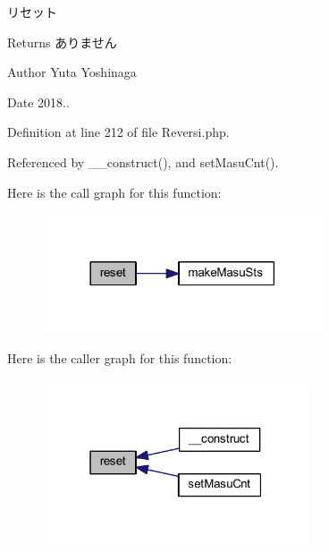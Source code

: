 リセット 

\begin{DoxyReturn}{Returns}
ありません 
\end{DoxyReturn}
\begin{DoxyAuthor}{Author}
Yuta Yoshinaga 
\end{DoxyAuthor}
\begin{DoxyDate}{Date}
2018.. 
\end{DoxyDate}


Definition at line 212 of file Reversi.\+php.



Referenced by \+\_\+\+\_\+construct(), and set\+Masu\+Cnt().



Here is the call graph for this function\+:
\nopagebreak
\begin{figure}[H]
\begin{center}
\leavevmode
\includegraphics[width=234pt]{class_reversi_a4a20559544fdf4dcb457e258dc976cf8_cgraph}
\end{center}
\end{figure}




Here is the caller graph for this function\+:
\nopagebreak
\begin{figure}[H]
\begin{center}
\leavevmode
\includegraphics[width=223pt]{class_reversi_a4a20559544fdf4dcb457e258dc976cf8_icgraph}
\end{center}
\end{figure}


